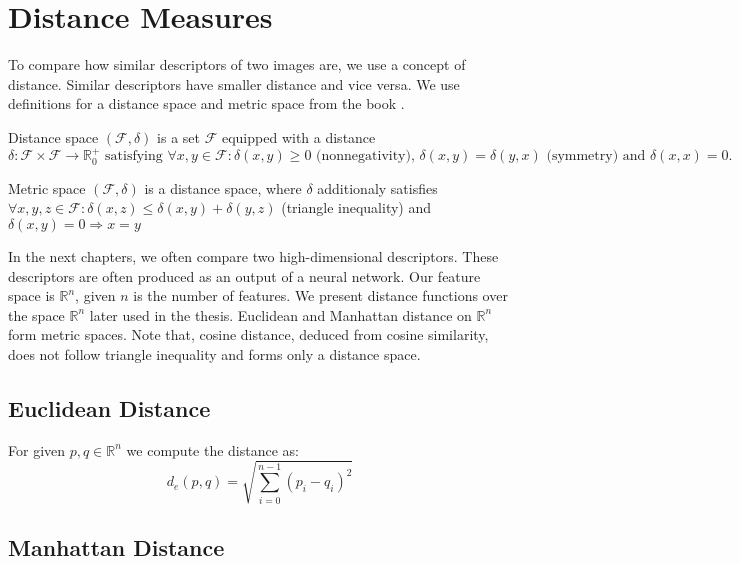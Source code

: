 \section{Distance Measures}
\label{s:distance_measures}

To compare how similar descriptors of two images are, we use a concept of distance. Similar descriptors have smaller distance and vice versa. We use definitions for a distance space and metric space from the book \cite{deza2009encyclopedia}.

\theoremstyle{definition}
\begin{definition}{Distance space}
$(\mathcal{F}, \delta )$ is a set $\mathcal{F}$ equipped
with a distance $\delta : \mathcal{F} \times \mathcal{F} \rightarrow \mathbb{R}^+_0 \text{ satisfying } \forall x, y \in \mathcal{F}: \delta(x, y) \geq 0 \text{ (nonnegativity), } \delta(x, y) = \delta(y, x) \text{ (symmetry) and } \delta(x, x) = 0.$
\end{definition}

\theoremstyle{definition}
\begin{definition}{Metric space}
$(\mathcal{F}, \delta)$ is a distance space, where $\delta$ additionaly satisfies $\forall x, y, z \in \mathcal{F} : \delta(x,z) \leq \delta(x,y) + \delta(y,z)$ (triangle inequality) and $\delta(x, y) = 0 \Rightarrow x = y$
\end{definition}

In the next chapters, we often compare two high-dimensional descriptors. These descriptors are often produced as an output of a neural network. Our feature space is $\mathbb{R}^n$, given $n$ is the number of features. We present distance functions over the space $\mathbb{R}^n$ later used in the thesis. Euclidean and Manhattan distance on $\mathbb{R}^n$ form metric spaces. Note that, cosine distance, deduced from cosine similarity, does not follow triangle inequality and forms only a distance space.

\subsection{Euclidean Distance}

For given $p, q \in \mathbb{R}^n$ we compute the distance as:
\begin{equation}
d_e({p},{q}) = \sqrt{\sum_{i=0}^{n-1} (p_i - q_i)^2}    
\end{equation}


\subsection{Manhattan Distance}

